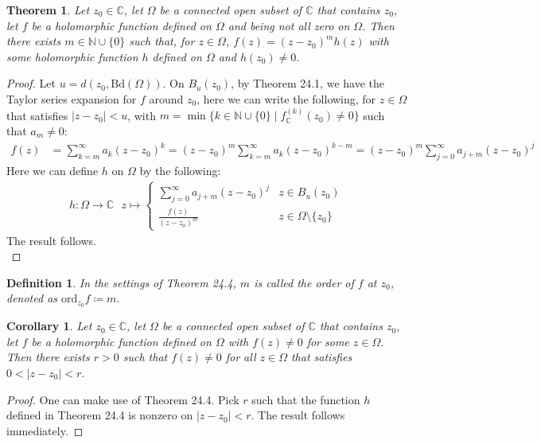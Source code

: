 \documentclass[11pt,oneside]{book}
\theoremstyle{break}
\theoremstyle{break}
\newtheorem{thm}{Theorem}[section]
\newtheorem{corT}[lem]{Corollary}
\newtheorem{defn}{Definition}[corL]
\newcommand{\N}{\mathbb{N}}
\newcommand{\Complex}{\mathbb{C}}
\newcommand{\Bd}{\text{Bd}}
\begin{document}
\begin{thm}
Let $z_0 \in \Complex$, let $\Omega$ be a connected open subset of $\Complex$ that contains $z_0$, let $f$ be a holomorphic function defined on $\Omega$ and being not all zero on $\Omega$. Then there exists $m \in \N\cup\{0\}$ such that, for $z \in \Omega$, $f(z) = (z-z_0)^m h(z)$ with some holomorphic function $h$ defined on $\Omega$ and $h(z_0) \neq 0$. 
\end{thm}
\begin{proof}
Let $u = d(z_0, \Bd(\Omega))$. On $B_u (z_0)$, by Theorem 24.1, we have the Taylor series expansion for $f$ around $z_0$, here we can write the following, for $z \in \Omega$ that satisfies $|z-z_0|<u$, with $m=\min\{ k \in \N \cup \{0\} \mid f^{(k)}_\Complex(z_0 ) \neq 0 \}$ such that $a_m \neq 0$:
\begin{align*}
f(z) &= \sum_{k=m}^\infty a_k (z-z_0)^k
= (z-z_0)^m \sum_{k=m}^\infty a_k (z-z_0)^{k-m}
= (z-z_0)^m \sum_{j=0}^\infty a_{j+m} (z-z_0)^{j}
\end{align*}
Here we can define $h$ on $\Omega$ by the following:
\begin{align*}
h:\Omega \to \Complex \ \ \ z\mapsto \begin{cases}
\sum_{j=0}^\infty a_{j+m} (z-z_0)^{j} & z \in B_u (z_0)\\
\frac{f(z)}{(z-z_0)^m} & z \in \Omega\setminus \{z_0\}
\end{cases}
\end{align*}
The result follows.\\
\end{proof}

\begin{defn}
In the settings of Theorem 24.4, $m$ is called the order of $f$ at $z_0$, denoted as $\text{ord}_{z_0}f \coloneqq m$.
\end{defn}


\begin{corT}
Let $z_0 \in \Complex$, let $\Omega$ be a connected open subset of $\Complex$ that contains $z_0$, let $f$ be a holomorphic function defined on $\Omega$ with $f(z) \neq 0$ for some $z \in \Omega$. Then there exists $r>0$ such that $f(z) \neq 0$ for all $z \in \Omega$ that satisfies $0<|z-z_0|<r$. 
\end{corT}
\begin{proof}
One can make use of Theorem 24.4. Pick $r$ such that the function $h$ defined in Theorem 24.4 is nonzero on $|z-z_0|<r$. The result follows immediately.
\end{proof}
\end{document}
